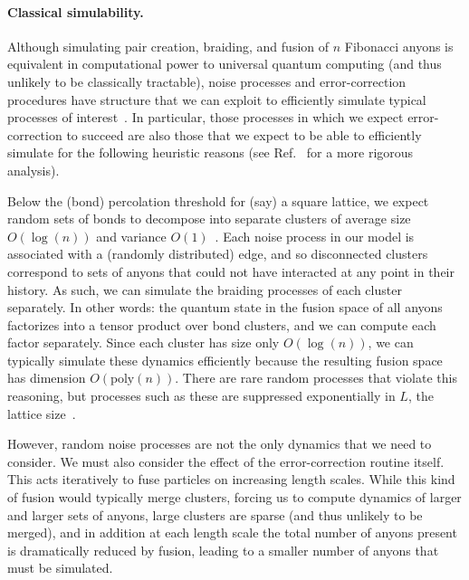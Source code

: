 \documentclass[aps, prl, letterpaper, twocolumn, superscriptaddress, notitlepage, 10pt]{revtex4-1}
\begin{document}
\paragraph{Classical simulability.}

Although simulating pair creation, braiding, and fusion of $n$ Fibonacci anyons is equivalent in computational power to universal quantum computing (and thus unlikely to be classically tractable), noise processes and error-correction procedures have structure that we can exploit to efficiently simulate typical processes of interest~\cite{RGsim}. In particular, those processes in which we expect error-correction to succeed are also those that we expect to be able to efficiently 
simulate for the following heuristic reasons (see Ref.~\cite{RGsim} for a more rigorous analysis).

Below the (bond) percolation threshold for (say) a square lattice, we expect random sets of bonds to decompose into separate clusters of average size $O(\log(n))$ and variance $O(1)$~\cite{Bazant2000}.  Each noise process in our model is associated with a (randomly distributed) edge, and so disconnected clusters correspond to sets of anyons that could not have interacted at any point in their history. As such, we can simulate the braiding processes of each cluster separately. In other words: the quantum state in the fusion space of all anyons factorizes into a tensor product over bond clusters, and we can compute each factor separately. Since each cluster has size only $O(\log(n))$, we can typically simulate these dynamics efficiently because the resulting fusion space has dimension $O(\mathrm{poly}(n))$. There are rare random processes that violate this reasoning, but processes such as these are suppressed exponentially in $L$, the lattice size~\cite{Grimmett1989}. 

However, random noise processes are not the only dynamics that we need to consider. We must also consider the effect of the error-correction routine itself. This acts iteratively to fuse particles on increasing length scales. While this kind of fusion would typically merge clusters, forcing us to compute dynamics of larger and larger sets of anyons, large clusters are sparse (and thus unlikely to be merged), and in addition at each length scale the total number of anyons present is dramatically reduced by fusion, leading to a smaller number of anyons that must be simulated.
\end{document}

